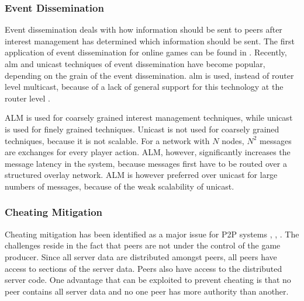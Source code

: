 \documentclass[10pt,a4paper,journal,cspaper,compsoc]{IEEEtran}
\begin{document}

\subsubsection{Event Dissemination}
Event dissemination deals with how information should be sent to peers after interest management has determined which information should be sent. The
first application of event dissemination for online games can be found in \cite{first_GED}. Recently, \ac{alm} and unicast techniques of event
dissemination have become popular, depending on the grain of the event dissemination. \ac{alm} is used, instead of router level multicast, because of
a lack of general support for this technology at the router level \cite{ip_multicast_deployment_issues}.

ALM is used for coarsely grained interest management techniques, while unicast is used for finely grained techniques. Unicast is not used for
coarsely grained techniques, because it is not scalable. For a network with $N$ nodes, $N^2$ messages are exchanges for every player action. ALM,
however, significantly increases the message latency in the system, because messages first have to be routed over a structured overlay network. ALM
is however preferred over unicast for large numbers of messages, because of the weak scalability of unicast.

\subsubsection{Cheating Mitigation}
\label{key_challenges_cheating}

Cheating mitigation has been identified as a major issue for P2P systems \cite{knutsson_p2p_first}, \cite{challenges_p2p_gaming},
\cite{cheat_proof_event_ordering}. The challenges reside in the fact that peers are not under the control of the game producer. Since all server data
are distributed amongst peers, all peers have access to sections of the server data. Peers also have access to the distributed server code. One
advantage that can be exploited to prevent cheating is that no peer contains all server data and no one peer has more authority than another.
\end{document}
